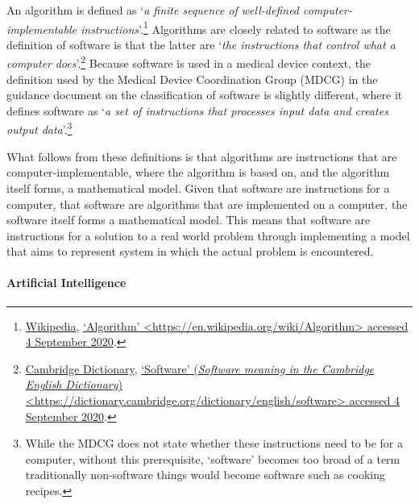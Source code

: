 \documentclass[
]{scrartcl}
\begin{document}
An algorithm is defined as `\emph{a finite sequence of well-defined computer-implementable instructions}'.\footnote{\protect\hyperlink{ref-wikipediaAlgorithm}{Wikipedia}, \protect\hyperlink{ref-wikipediaAlgorithm}{{`Algorithm'} \textless{}\url{https://en.wikipedia.org/wiki/Algorithm}\textgreater{} accessed 4 September 2020}.} Algorithms are closely related to software as the definition of software is that the latter are `\emph{the instructions that control what a computer} \emph{does}'.\footnote{\protect\hyperlink{ref-cambridgedictionarySoftware}{Cambridge Dictionary}, \protect\hyperlink{ref-cambridgedictionarySoftware}{{`Software'} (\emph{Software \textbar{} meaning in the Cambridge English Dictionary}) \textless{}\url{https://dictionary.cambridge.org/dictionary/english/software}\textgreater{} accessed 4 September 2020}.} Because software is used in a medical device context, the definition used by the Medical Device Coordination Group (MDCG) in the guidance document on the classification of software is slightly different, where it defines software as `\emph{a set of instructions that processes input data and creates output data}'.\footnote{While the MDCG does not state whether these instructions need to be for a computer, without this prerequisite, `software' becomes too broad of a term traditionally non-software things would become software such as cooking recipes.\footnotemark{}}

What follows from these definitions is that algorithms are instructions that are computer-implementable, where the algorithm is based on, and the algorithm itself forms, a mathematical model. Given that software are instructions for a computer, that software are algorithms that are implemented on a computer, the software itself forms a mathematical model. This means that software are instructions for a solution to a real world problem through implementing a model that aims to represent system in which the actual problem is encountered.

\hypertarget{artificial-intelligence}{%
\paragraph*{Artificial Intelligence}\label{artificial-intelligence}}
\end{document}
